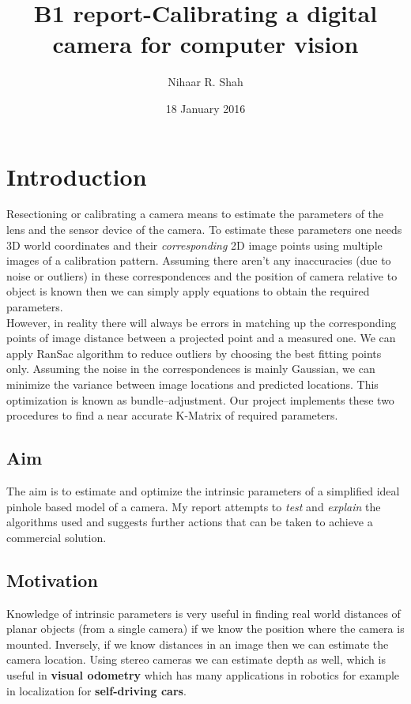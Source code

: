 \documentclass[titlepage]{article}
\begin{document}
\title{B1 report-Calibrating a digital camera for computer vision}
\author{Nihaar R. Shah}
\date{18 January 2016}

\maketitle
\doublespacing
\section{Introduction}
Resectioning or calibrating a camera means to estimate the parameters of the lens and the sensor device of the camera. To estimate these parameters one needs 3D world coordinates and their \textit{corresponding} 2D image points using multiple images of a calibration pattern. Assuming there aren't any inaccuracies (due to noise or outliers) in these correspondences and the position of camera relative to object is known then we can simply apply equations to obtain the required parameters. \\
However, in reality there will always be errors in matching up the corresponding points of image distance between a projected point and a measured one. We can apply RanSac algorithm to reduce outliers by choosing the best fitting points only. Assuming the noise in the correspondences is mainly Gaussian, we can minimize the variance between image locations and predicted locations. This optimization is known as bundle–adjustment. Our project implements these two procedures to find a near accurate K-Matrix of required parameters.
\subsection{Aim}
The aim is to estimate and optimize the intrinsic parameters of a simplified ideal pinhole based model of a camera. My report attempts to \textit{test} and \textit{explain} the algorithms used and suggests further actions that can be taken to achieve a commercial solution.
\subsection{Motivation}
Knowledge of intrinsic parameters is very useful in finding real world distances of planar objects (from a single camera) if we know the position where the camera is mounted. Inversely, if we know distances in an image then we can estimate the camera location. Using stereo cameras we can estimate depth as well, which is useful in \textbf{visual odometry} which has many applications in robotics for example in localization for \textbf{self-driving cars}.
\end{document}
